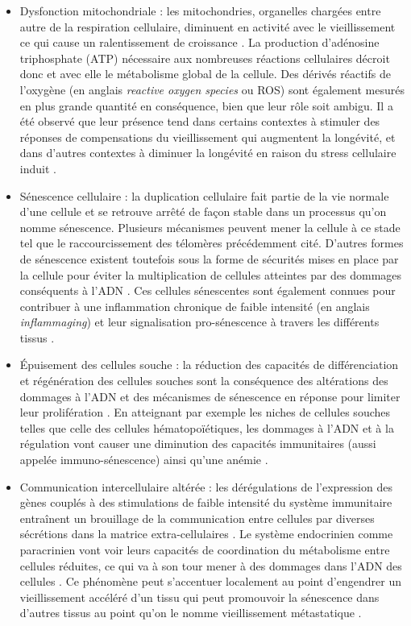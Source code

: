 \begin{itemize}
    \item Dysfonction mitochondriale : les mitochondries, organelles chargées entre autre de la respiration cellulaire, diminuent en activité avec le vieillissement ce qui cause un ralentissement de croissance \cite{Green2011Aug}. La production d'adénosine triphosphate (ATP) nécessaire aux nombreuses réactions cellulaires décroit donc et avec elle le métabolisme global de la cellule. Des dérivés réactifs de l'oxygène (en anglais \textit{reactive oxygen species} ou ROS) sont également mesurés en plus grande quantité en conséquence, bien que leur rôle soit ambigu. Il a été observé que leur présence tend dans certains contextes à stimuler des réponses de compensations du vieillissement qui augmentent la longévité, et dans d'autres contextes à diminuer la longévité en raison du stress cellulaire induit \cite{Ziegler2015Feb}.
    \item Sénescence cellulaire : la duplication cellulaire fait partie de la vie normale d'une cellule et se retrouve arrêté de façon stable dans un processus qu'on nomme sénescence. Plusieurs mécanismes peuvent mener la cellule à ce stade tel que le raccourcissement des télomères précédemment cité. D'autres formes de sénescence existent toutefois sous la forme de sécurités mises en place par la cellule pour éviter la multiplication de cellules atteintes par des dommages conséquents à l'ADN \cite{Khan2017Aug}. Ces cellules sénescentes sont également connues pour contribuer à une inflammation chronique de faible intensité (en anglais \textit{inflammaging}) \cite{Kuilman2010Nov,Franceschi2014} et leur signalisation pro-sénescence à travers les différents tissus \cite{Khan2017Aug}.
    \item Épuisement des cellules souche : la réduction des capacités de différenciation et régénération des cellules souches sont la conséquence des altérations des dommages à l'ADN et des mécanismes de sénescence en réponse pour limiter leur prolifération \cite{Sharpless2007Sep}. En atteignant par exemple les niches de cellules souches telles que celle des cellules hématopoïétiques, les dommages à l'ADN et à la régulation vont causer une diminution des capacités immunitaires (aussi appelée immuno-sénescence) ainsi qu'une anémie \cite{Lopez-Otin2013,Baker2016Feb}.
    \item Communication intercellulaire altérée : les dérégulations de l'expression des gènes couplés à des stimulations de faible intensité du système immunitaire entraînent un brouillage de la communication entre cellules par diverses sécrétions dans la matrice extra-cellulaires \cite{Lopez-Otin2013}. Le système endocrinien comme paracrinien vont voir leurs capacités de coordination du métabolisme entre cellules réduites, ce qui va à son tour mener à des dommages dans l'ADN des cellules \cite{Khan2017Aug}. Ce phénomène peut s'accentuer localement au point d'engendrer un vieillissement accéléré d'un tissu qui peut promouvoir la sénescence dans d'autres tissus au point qu'on le nomme vieillissement métastatique \cite{Lavasani2012Jan}.
\end{itemize}
\hfill


